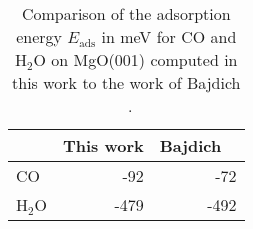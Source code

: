 \begin{table}[h]
\caption{\label{tab:rpa_validation}Comparison of the adsorption energy $E_\text{ads}$ in meV for CO and H$_2$O on MgO(001) computed in this work to the work of Bajdich \etal{}~\cite{bajdichSurfaceEnergeticsAlkalineearth2015b}.}
\begin{adjustbox}{center}
\begin{tabular}{lrr}
\toprule
 & This work & Bajdich \etal{}~\cite{bajdichSurfaceEnergeticsAlkalineearth2015b} \\ 
\midrule
CO & -92 & -72 \\
H$_2$O & -479 & -492 \\
\bottomrule
\end{tabular}
\end{adjustbox}
\end{table}